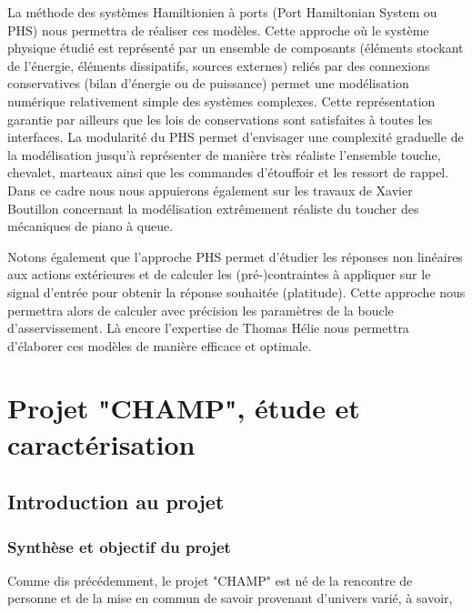 \documentclass[french,a4paper,12pt]{report}
\begin{document}
La méthode des systèmes Hamiltionien à ports (Port Hamiltonian System ou PHS) nous permettra de réaliser ces modèles. Cette approche où le système physique étudié est représenté par un ensemble de composants (éléments stockant de l’énergie, éléments dissipatifs, sources externes) reliés par des connexions conservatives (bilan d’énergie ou de puissance) permet une modélisation numérique relativement simple des systèmes complexes. Cette représentation garantie par ailleurs que les lois de conservations sont satisfaites à toutes les interfaces. La modularité du PHS permet d’envisager une complexité graduelle de la modélisation jusqu’à représenter de manière très réaliste l’ensemble touche, chevalet, marteaux ainsi que les commandes d’étouffoir et les ressort de rappel. Dans ce cadre nous nous appuierons également sur les travaux de Xavier Boutillon concernant la modélisation extrêmement réaliste du toucher des mécaniques de piano à queue.

Notons également que l’approche PHS permet d’étudier les réponses non linéaires aux actions extérieures et de calculer les (pré-)contraintes à appliquer sur le signal d’entrée pour obtenir la réponse souhaitée (platitude). Cette approche nous permettra alors de calculer avec précision les paramètres de la boucle d’asservissement. Là encore l’expertise de Thomas Hélie nous permettra d’élaborer ces modèles de manière efficace et optimale.



%
%
\part{Projet "CHAMP", étude et caractérisation}

	\chapter{Introduction au projet}
	
	\section{Synthèse et objectif du projet}
	
	Comme dis précédemment, le projet "CHAMP" est né de la rencontre de personne et de la mise en commun de savoir provenant d'univers varié, à savoir, 
	
\end{document}
